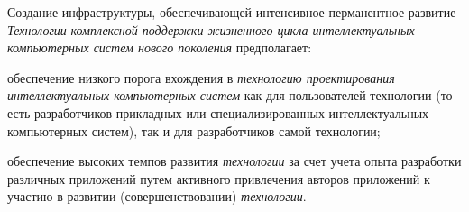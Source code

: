 Создание инфраструктуры, обеспечивающей интенсивное перманентное развитие \textit{Технологии} \textit{комплексной поддержки жизненного цикла интеллектуальных компьютерных систем нового поколения} предполагает:

\begin{textitemize}
	\item обеспечение низкого порога вхождения в \textit{технологию проектирования интеллектуальных компьютерных систем} как для пользователей технологии (то есть разработчиков прикладных или специализированных интеллектуальных компьютерных систем), так и для разработчиков самой технологии;
	\item обеспечение высоких темпов развития \textit{технологии} за счет учета опыта разработки различных приложений путем активного привлечения авторов приложений к участию в развитии (совершенствовании) \textit{технологии}.
\end{textitemize}

